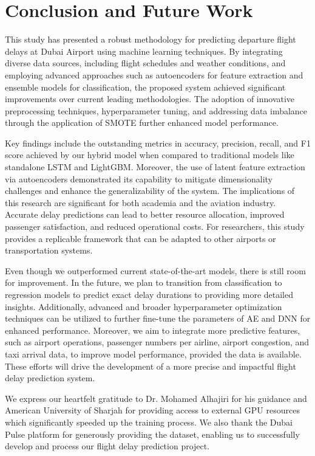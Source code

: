 \documentclass[twoside,11pt]{article}
\begin{document}
\section{Conclusion and Future Work}
This study has presented a robust methodology for predicting departure flight delays at Dubai Airport using machine learning techniques. By integrating diverse data sources, including flight schedules and weather conditions, and employing advanced approaches such as autoencoders for feature extraction and ensemble models for classification, the proposed system achieved significant improvements over current leading methodologies. The adoption of innovative preprocessing techniques, hyperparameter tuning, and addressing data imbalance through the application of SMOTE further enhanced model performance.

Key findings include the outstanding metrics in accuracy, precision, recall, and F1 score achieved by our hybrid model when compared to traditional models like standalone LSTM and LightGBM. Moreover, the use of latent feature extraction via autoencoders demonstrated its capability to mitigate dimensionality challenges and enhance the generalizability of the system. The implications of this research are significant for both academia and the aviation industry. Accurate delay predictions can lead to better resource allocation, improved passenger satisfaction, and reduced operational costs. For researchers, this study provides a replicable framework that can be adapted to other airports or transportation systems.

Even though we outperformed current state-of-the-art models, there is still room for improvement. In the future, we plan to transition from classification to regression models to predict exact delay durations to providing more detailed insights. Additionally, advanced and broader hyperparameter optimization techniques can be utilized to further fine-tune the parameters of AE and DNN for enhanced performance. Moreover, we aim to integrate more predictive features, such as airport operations, passenger numbers per airline, airport congestion, and taxi arrival data, to improve model performance, provided the data is available. These efforts will drive the development of a more precise and impactful flight delay prediction system.

\acks{}
We express our heartfelt gratitude to Dr. Mohamed Alhajiri for his guidance and American University of Sharjah for providing access to external GPU resources which significantly speeded up the training process. We also thank the Dubai Pulse platform for generously providing the dataset, enabling us to successfully develop and process our flight delay prediction project. 
\end{document}
